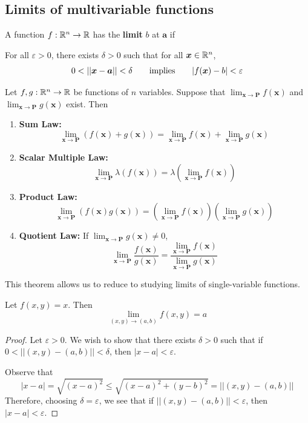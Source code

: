 \subsection{Limits of multivariable functions}\label{limmulti}

\begin{definition}
    A function $f : \mathbb{R}^n \to \mathbb{R}$ has the \textbf{limit} $b$ at $\bm{a}$ if
    
    \vspace{1em}
    For all $\varepsilon>0$, there exists $\delta > 0$ such that for all $\bm{x} \in \mathbb{R}^n$, $$0 < ||\bm{x} - \bm{a} || < \delta \qquad \textnormal{implies} \qquad |f(\bm{x}) - b | < \varepsilon$$
    \end{definition}

\begin{theorem}\label{limmultirules}
     Let $f,g : \mathbb{R}^n \to \mathbb{R}$ be functions of $n$ variables. Suppose that $\lim_{\bm{x} \to \bm{P}}f(\bm{x})$ and $\lim_{\bm{x} \to \bm{P}}g(\bm{x})$ exist. Then 
    
    \begin{enumerate}
        \item \textbf{Sum Law:} $$\lim_{\bm{x} \to \bm{P}} \left(f(\bm{x}) + g(\bm{x})\right) = \lim_{\bm{x} \to \bm{P}} f(\bm{x}) + \lim_{\bm{x} \to \bm{P}} g(\bm{x})$$
        \item \textbf{Scalar Multiple Law:} $$\lim_{\bm{x} \to \bm{P}} \lambda(f(\bm{x})) = \lambda \left(\lim_{\bm{x} \to \bm{P}} f(\bm{x}) \right)$$
        \item \textbf{Product Law:} $$\lim_{\bm{x} \to \bm{P}} \left(f(\bm{x})g(\bm{x})\right) = \left(\lim_{\bm{x} \to \bm{P}}f(\bm{x})\right)\left(\lim_{\bm{x} \to \bm{P}} g(\bm{x})\right)$$
        \item \textbf{Quotient Law:} If $\lim_{\bm{x} \to \bm{P}} g(\bm{x})\neq 0$, $$\lim_{\bm{x} \to \bm{P}} \frac{f(\bm{x})}{g(\bm{x})} = \frac{\lim_{\bm{x} \to \bm{P}}f(\bm{x})}{\lim_{\bm{x} \to \bm{P}} g(\bm{x})}$$
    \end{enumerate}
    
    
    \end{theorem}

This theorem allows us to reduce to studying limits of single-variable functions.
    
    \begin{example}
Let $f(x,y) = x$.  Then $$\lim_{(x,y) \to (a,b)}f(x,y) = a$$

\begin{proof}
Let $\varepsilon > 0$.  We wish to show that there exists $\delta > 0$ such that if $0 < ||(x,y) - (a,b) || < \delta$, then $|x-a| < \varepsilon$.

Observe that $$|x-a| = \sqrt{(x-a)^2} \leq \sqrt{(x-a)^2 +(y-b)^2} = ||(x,y) - (a,b) ||$$
Therefore, choosing $\delta = \varepsilon$, we see that if $||(x,y) - (a,b) || < \varepsilon$, then $|x-a| < \varepsilon$.

\end{proof}

\end{example}    


